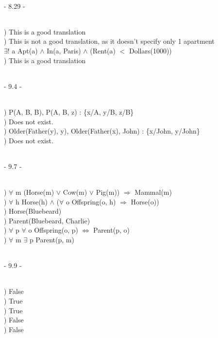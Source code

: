 \documentclass[12pt]{article}
\begin{document}
\noindent \hrulefill \\



\centerline{- 8.29 - }
\ \\
) This is a good translation\\[.4em]
) This is not a good translation, as it doesn't specify only 1 apartment\\
\indent $\exists$! a Apt(a) $\wedge$ In(a, Paris) $\wedge$ (Rent(a) $<$ Dollars(1000))\\[.4em]
) This is a good translation\\[.4em]



\noindent \hrulefill \\



\centerline{- 9.4 - }
\ \\
) P(A, B, B), P(A, B, z) : \{x/A, y/B, z/B\}\\[.4em]
) Does not exist.\\[.4em]
) Older(Father(y), y), Older(Father(x), John) : \{x/John, y/John\}\\[.4em]
) Does not exist.\\[.4em]



\noindent \hrulefill \\



\centerline{- 9.7 - }
\ \\
) $\forall$ m (Horse(m) $\vee$ Cow(m) $\vee$ Pig(m)) $\Rightarrow$ Mammal(m)\\[.4em]
) $\forall$ h Horse(h) $\wedge$ ($\forall$ o Offspring(o, h) $\Rightarrow$ Horse(o))\\[.4em]
) Horse(Bluebeard)\\[.4em]
) Parent(Bluebeard, Charlie)\\[.4em]
) $\forall$ p $\forall$ o Offspring(o, p) $\Leftrightarrow$ Parent(p, o)\\[.4em]
) $\forall$ m $\exists$ p Parent(p, m)\\[.4em]



\noindent \hrulefill \\



\centerline{- 9.9 - }
\ \\
) False\\[.4em]
) True\\[.4em]
) True\\[.4em]
) False\\[.4em]
) False\\[.4em]
\end{document}
